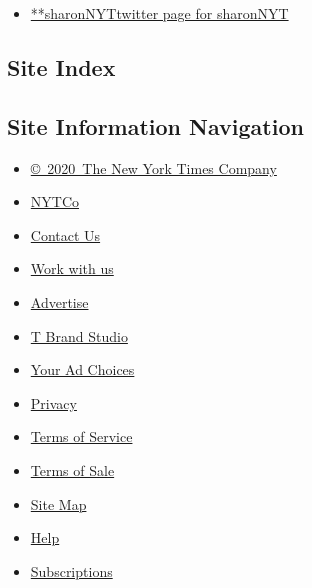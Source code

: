 \begin{itemize}
\tightlist
\item
  \href{https://twitter.com/sharonNYT}{**sharonNYTtwitter page for
  sharonNYT}
\end{itemize}

\hypertarget{site-index}{%
\subsection{Site Index}\label{site-index}}

\hypertarget{site-information-navigation}{%
\subsection{Site Information
Navigation}\label{site-information-navigation}}

\begin{itemize}
\tightlist
\item
  \href{https://help.nytimes3xbfgragh.onion/hc/en-us/articles/115014792127-Copyright-notice}{©~2020~The
  New York Times Company}
\end{itemize}

\begin{itemize}
\tightlist
\item
  \href{https://www.nytco.com/}{NYTCo}
\item
  \href{https://help.nytimes3xbfgragh.onion/hc/en-us/articles/115015385887-Contact-Us}{Contact
  Us}
\item
  \href{https://www.nytco.com/careers/}{Work with us}
\item
  \href{https://nytmediakit.com/}{Advertise}
\item
  \href{http://www.tbrandstudio.com/}{T Brand Studio}
\item
  \href{https://www.nytimes3xbfgragh.onion/privacy/cookie-policy\#how-do-i-manage-trackers}{Your
  Ad Choices}
\item
  \href{https://www.nytimes3xbfgragh.onion/privacy}{Privacy}
\item
  \href{https://help.nytimes3xbfgragh.onion/hc/en-us/articles/115014893428-Terms-of-service}{Terms
  of Service}
\item
  \href{https://help.nytimes3xbfgragh.onion/hc/en-us/articles/115014893968-Terms-of-sale}{Terms
  of Sale}
\item
  \href{https://spiderbites.nytimes3xbfgragh.onion}{Site Map}
\item
  \href{https://help.nytimes3xbfgragh.onion/hc/en-us}{Help}
\item
  \href{https://www.nytimes3xbfgragh.onion/subscription?campaignId=37WXW}{Subscriptions}
\end{itemize}
